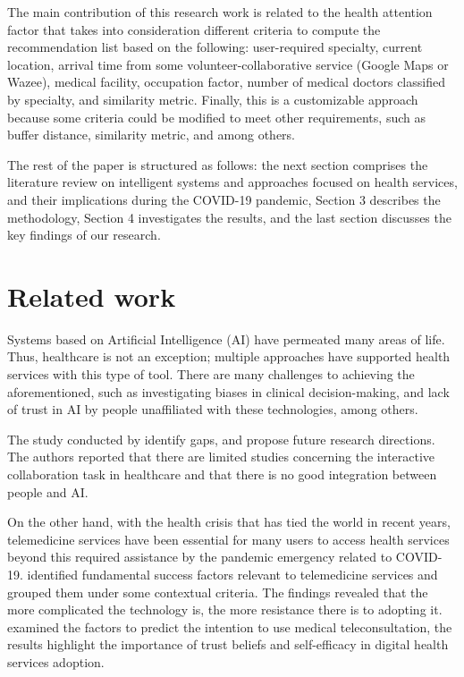 \documentclass[sustainability,article,submit,pdftex,moreauthors]{Definitions/mdpi}
\begin{document}
The main contribution of this research work is related to the health attention factor that takes into consideration different criteria to compute the recommendation list based on the following: user-required specialty, current location, arrival time from some volunteer-collaborative service (Google Maps or Wazee), medical facility, occupation factor, number of medical doctors classified by specialty, and similarity metric.  Finally, this is a customizable approach because some criteria could be modified to meet other requirements, such as buffer distance, similarity metric, and among others.

The rest of the paper is structured as follows: the next section comprises the literature review on intelligent systems and approaches focused on health services, and their implications during the COVID-19 pandemic, Section 3 describes the methodology, Section 4 investigates the results, and the last section discusses the key findings of our research.

\section{Related work}

Systems based on Artificial Intelligence (AI) have permeated many areas of life. Thus, healthcare is not an exception; multiple approaches have supported health services with this type of tool. There are many challenges to achieving the aforementioned, such as investigating biases in clinical decision-making, and lack of trust in AI by people unaffiliated with these technologies, among others. 

The study conducted by \citet{lai2021human} identify gaps, and propose future research directions. The authors reported that there are limited studies concerning the interactive collaboration task in healthcare and that there is no good integration between people and AI.

On the other hand, with the health crisis that has tied the world in recent years, telemedicine services have been essential for many users to access health services beyond this required assistance by the pandemic emergency related to COVID-19. \citet{chauhan2022implications} identified fundamental success factors relevant to telemedicine services and grouped them under some contextual criteria. The findings revealed that the more complicated the technology is, the more resistance there is to adopting it. \citet{baudier2022digital} examined the factors to predict the intention to use medical teleconsultation, the results highlight the importance of trust beliefs and self-efficacy in digital health services adoption.
\end{document}
